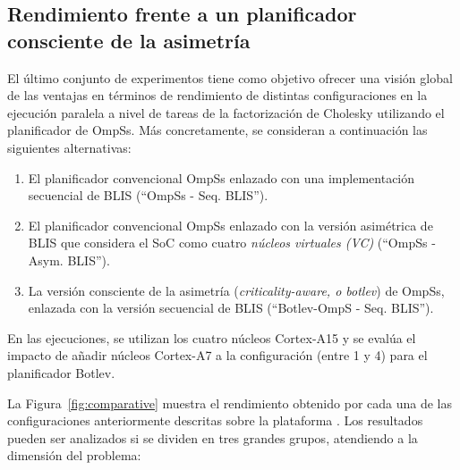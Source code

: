 \subsection{Rendimiento frente a un planificador consciente de la asimetría}
\label{sec:comparative}

El último conjunto de experimentos tiene como objetivo ofrecer una visión global de las ventajas en términos
de rendimiento de distintas configuraciones en la ejecución paralela a nivel de tareas de la factorización de
Cholesky utilizando el planificador de OmpSs. Más concretamente, se consideran a continuación las siguientes
alternativas:

\begin{enumerate}

	\item El planificador convencional OmpSs enlazado con una implementación secuencial de BLIS (``OmpSs - Seq. BLIS'').
	\item El planificador convencional OmpSs enlazado con la versión asimétrica de BLIS que considera el SoC como cuatro {\em núcleos virtuales (VC)} (``OmpSs - Asym. BLIS'').
	\item La versión consciente de la asimetría ({\em criticality-aware, o botlev}) de OmpSs, enlazada con la versión secuencial de BLIS (``Botlev-OmpS - Seq. BLIS''). 

\end{enumerate}

En las ejecuciones, se utilizan los cuatro núcleos Cortex-A15 y se evalúa el impacto de añadir núcleos 
Cortex-A7 a la configuración (entre 1 y 4) para el planificador Botlev.


La Figura~\ref{fig:comparative} muestra el rendimiento obtenido por cada una de las configuraciones
anteriormente descritas sobre la plataforma \odroid. Los resultados pueden ser analizados si se dividen 
en tres grandes grupos, atendiendo a la dimensión del problema:

